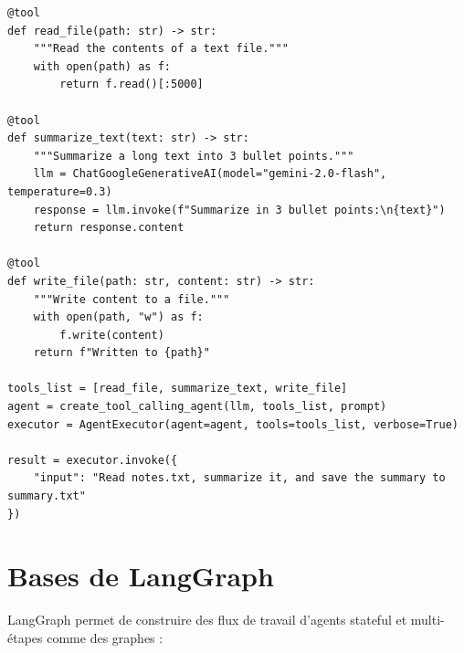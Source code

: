 \begin{verbatim}
@tool
def read_file(path: str) -> str:
    """Read the contents of a text file."""
    with open(path) as f:
        return f.read()[:5000]

@tool
def summarize_text(text: str) -> str:
    """Summarize a long text into 3 bullet points."""
    llm = ChatGoogleGenerativeAI(model="gemini-2.0-flash", temperature=0.3)
    response = llm.invoke(f"Summarize in 3 bullet points:\n{text}")
    return response.content

@tool
def write_file(path: str, content: str) -> str:
    """Write content to a file."""
    with open(path, "w") as f:
        f.write(content)
    return f"Written to {path}"

tools_list = [read_file, summarize_text, write_file]
agent = create_tool_calling_agent(llm, tools_list, prompt)
executor = AgentExecutor(agent=agent, tools=tools_list, verbose=True)

result = executor.invoke({
    "input": "Read notes.txt, summarize it, and save the summary to summary.txt"
})
\end{verbatim}

\section{Bases de LangGraph}

LangGraph permet de construire des flux de travail d'agents stateful et multi-\'etapes comme des graphes :

